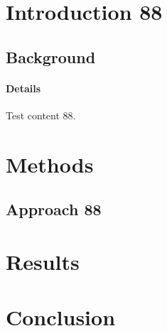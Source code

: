 \documentclass{article}
\begin{document}
\section{Introduction 88}
\subsection{Background}
\paragraph{Details} Test content 88.
\section{Methods}
\subsection{Approach 88}
\section{Results}
\section{Conclusion}
\end{document}
